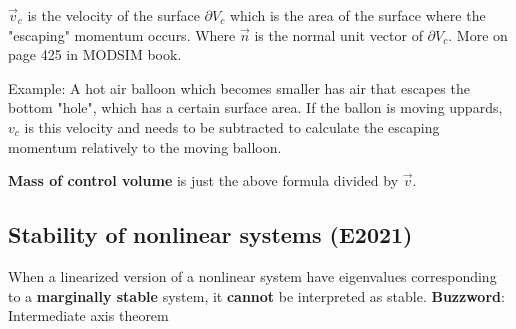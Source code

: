 $\Vec{v}_c$ is the velocity of the surface $\partial V_c$ which is the area of the surface where the "escaping" momentum occurs. Where $\Vec{n}$ is the normal unit vector of $\partial V_c$. More on page 425 in MODSIM book.

Example: A hot air balloon which becomes smaller has air that escapes the bottom "hole", which has a certain surface area. If the ballon is moving uppards, $v_c$ is this velocity and needs to be subtracted to calculate the escaping momentum relatively to the moving balloon.

\textbf{Mass of control volume} is just the above formula divided by $\Vec{v}$.


\subsection{Stability of nonlinear systems (E2021)}

When a linearized version of a nonlinear system have eigenvalues corresponding to a \textbf{marginally stable} system, it \textbf{cannot} be interpreted as stable.
\textbf{Buzzword}: Intermediate axis theorem
